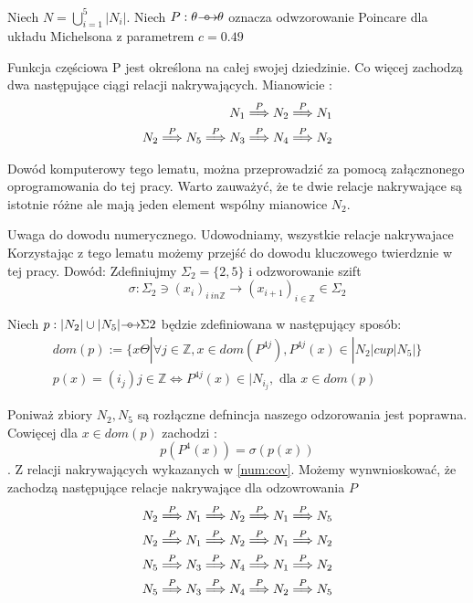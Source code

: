 Niech $ N = \bigcup^5_{i=1} | N_i| $. Niech $ P : \theta {\mathrel{\longrightarrow\mkern-25mu\circ}\;\;} \theta $ oznacza odwzorowanie Poincare dla układu Michelsona z parametrem $ c = 0.49 $

\begin{lemma}
\label{num:cov}
 Funkcja częściowa P jest określona na całej swojej dziedzinie.
 Co więcej zachodzą dwa następujące ciągi relacji nakrywających. Mianowicie :
 \begin{eqnarray*}
    N_1 \stackrel{P}{\Longrightarrow} N_2 \stackrel{P}{\Longrightarrow} N_1 \\
    N_2 \stackrel{P}{\Longrightarrow} N_5 \stackrel{P}{\Longrightarrow} N_3 \stackrel{P}{\Longrightarrow} N_4 \stackrel{P}{\Longrightarrow} N_2 
 \end{eqnarray*}
 
 Dowód komputerowy tego lematu, można przeprowadzić za pomocą załącznonego oprogramowania do tej pracy.
 Warto zauważyć, że te dwie relacje nakrywające są istotnie różne ale mają jeden element wspólny mianowice $ N_2 $.
 

\end{lemma}
Uwaga do dowodu numerycznego. Udowodniamy, wszystkie relacje nakrywajace 
Korzystając z tego lematu możemy przejść do dowodu kluczowego twierdznie w tej pracy.
Dowód:
Zdefiniujmy $ \Sigma_2 = \{ 2,5 \} $ i odzworowanie szift 
$$
  \sigma : \Sigma_2 \ni (x_i)_{i \ in \mathbb Z} \to (x_{i+1})_{i \in \mathbb Z } \in \Sigma_2
$$

Niech $ p : | N_2 | \cup | N_5 | {\mathrel{\longrightarrow\mkern-25mu\circ}\;\;} \Sigma2 $ będzie zdefiniowana w następujący sposób:
\begin{eqnarray*}
  dom(p) := \{ x \Theta | \forall j \in \mathbb Z, x \in dom(P^{4j}), P^{4j}(x) \in |N_2| cup |N_5| \} \\ 
  p(x) = (i_j) j \in \mathbb Z \Leftrightarrow P^{4j}(x) \in |N_{i_j}, \text{ dla } x \in dom(p)
\end{eqnarray*}

Poniważ zbiory $ N_2, N_5 $ są rozłączne defnincja naszego odzorowania jest poprawna. Cowięcej dla $ x \in dom(p) $ zachodzi :
$$
  p(P^4(x)) = \sigma(p(x))
$$
.
Z relacji nakrywających wykazanych w \ref{num:cov}. Możemy wynwnioskować, że zachodzą następujące relacje nakrywające dla odzowrowania $ P $
\begin{eqnarray*}
  N_2 \stackrel{P}{\Longrightarrow} N_1 \stackrel{P}{\Longrightarrow} N_2 \stackrel{P}{\Longrightarrow} N_1 \stackrel{P}{\Longrightarrow} N_5 \\
  N_2 \stackrel{P}{\Longrightarrow} N_1 \stackrel{P}{\Longrightarrow} N_2 \stackrel{P}{\Longrightarrow} N_1 \stackrel{P}{\Longrightarrow} N_2 \\
  N_5 \stackrel{P}{\Longrightarrow} N_3 \stackrel{P}{\Longrightarrow} N_4 \stackrel{P}{\Longrightarrow} N_1 \stackrel{P}{\Longrightarrow} N_2 \\
  N_5 \stackrel{P}{\Longrightarrow} N_3 \stackrel{P}{\Longrightarrow} N_4 \stackrel{P}{\Longrightarrow} N_2 \stackrel{P}{\Longrightarrow} N_5
\end{eqnarray*}

